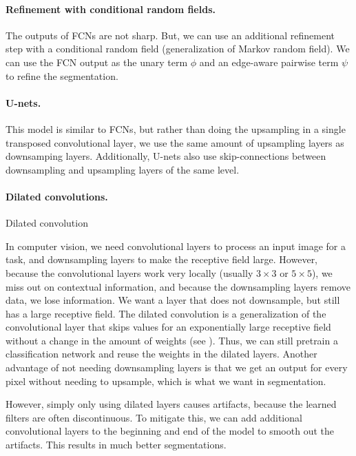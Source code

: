 \paragraph{Refinement with conditional random fields.}

The outputs of FCNs are not sharp. But, we can use an additional refinement
step with a conditional random field (generalization of Markov random field).
We can use the FCN output as the unary term $\phi$ and an edge-aware pairwise
term $\psi$ to refine the segmentation.

\paragraph{U-nets.}

This model is similar to FCNs, but rather than doing the upsampling in a single
transposed convolutional layer, we use the same amount of upsampling layers as
downsamping layers. Additionally, U-nets also use skip-connections between
downsampling and upsampling layers of the same level.

\paragraph{Dilated convolutions.}

\begin{marginfigure}
    \centering
    \caption{Dilated convolution}
    \label{fig:dilated-convolution}
\end{marginfigure}

In computer vision, we need convolutional layers to process an input image for
a task, and downsampling layers to make the receptive field large. However,
because the convolutional layers work very locally (usually $3\times 3$ or
$5\times 5$), we miss out on contextual information, and because the
downsampling layers remove data, we lose information. We want a layer that does
not downsample, but still has a large receptive field. The dilated convolution
is a generalization of the convolutional layer that skips values for an
exponentially large receptive field without a change in the amount of weights
(see ). Thus, we can still pretrain a
classification network and reuse the weights in the dilated layers. Another
advantage of not needing downsampling layers is that we get an output for every
pixel without needing to upsample, which is what we want in segmentation.

However, simply only using dilated layers causes artifacts, because the learned
filters are often discontinuous. To mitigate this, we can add additional
convolutional layers to the beginning and end of the model to smooth out the
artifacts. This results in much better segmentations.
